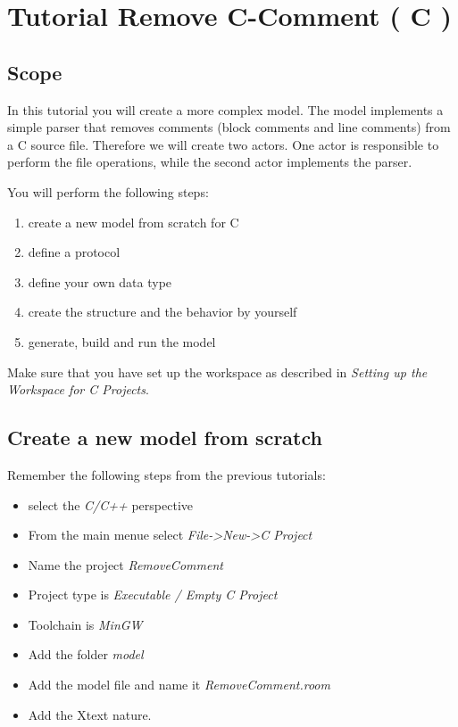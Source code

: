 \chapter{Tutorial Remove C-Comment ( C )}

\section{Scope}

In this tutorial you will create a more complex model. The model implements a simple parser that removes 
comments (block comments and line comments) from a C source file. Therefore we will create two actors. One 
actor is responsible to perform the file operations, while the second actor implements the parser.

You will perform the following steps:

\begin{enumerate}
\item create a new model from scratch for C
\item define a protocol
\item define your own data type
\item create the structure and the behavior by yourself
\item generate, build and run the model
\end{enumerate}

Make sure that you have set up the workspace as described in \textit{Setting up the Workspace for C 
Projects}.

\section{Create a new model from scratch}

Remember the following steps from the previous tutorials:
\begin{itemize}
\item select the \textit{C/C++} perspective
\item From the main menue select \textit{File->New->C Project}
\item Name the project \textit{RemoveComment}
\item Project type is \textit{Executable / Empty C Project}
\item Toolchain is \textit{MinGW}
\item Add the folder \textit{model}
\item Add the model file and name it \textit{RemoveComment.room}
\item Add the Xtext nature.
\end{itemize}

